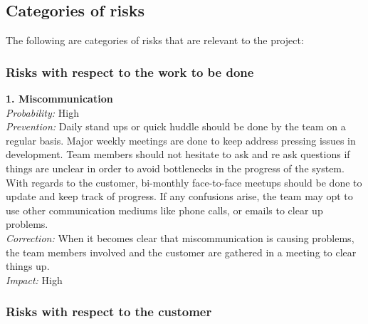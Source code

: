 \documentclass[12pt,letterpaper, margin=1in]{article}
\begin{document}
\subsection{Categories of risks}
The following are categories of risks that are relevant to the project: 

\subsubsection{Risks with respect to the work to be done}
\textbf{1. Miscommunication} \\
\textit{Probability:} High \\
\textit{Prevention:} Daily stand ups or quick huddle should be done by the team on a regular basis. Major weekly meetings are done to keep address pressing issues in development. Team members should not hesitate to ask and re ask questions if things are unclear in order to avoid bottlenecks in the progress of the system. With regards to the customer, bi-monthly face-to-face meetups should be done to update and keep track of progress. If any confusions arise, the team may opt to use other communication mediums like phone calls, or emails to clear up problems. \\
\textit{Correction:} When it becomes clear that miscommunication is causing problems, the team members involved and the customer are gathered in a meeting to clear things up. \\
\textit{Impact:} High \\

\subsubsection{Risks with respect to the customer}
\end{document}
